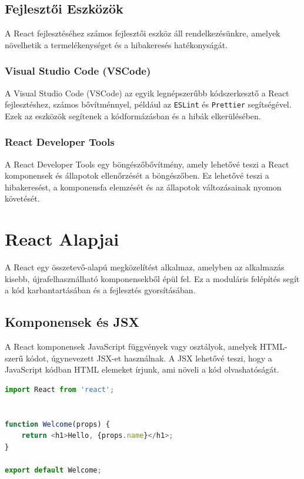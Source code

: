\documentclass[colorlinks]{thesis-kando}
\theoremstyle{definition}
\theoremstyle{remark}
\begin{document}
\subsection{Fejlesztői Eszközök}
A React fejlesztéséhez számos fejlesztői eszköz áll rendelkezésünkre, amelyek növelhetik a termelékenységet és a hibakeresés hatékonyságát.

\subsubsection{Visual Studio Code (VSCode)}
A Visual Studio Code (VSCode) az egyik legnépszerűbb kódszerkesztő a React fejlesztéshez, számos bővítménnyel, például az \texttt{ESLint} és \texttt{Prettier} segítségével. Ezek az eszközök segítenek a kódformázásban és a hibák elkerülésében.

\subsubsection{React Developer Tools}
A React Developer Tools egy böngészőbővítmény, amely lehetővé teszi a React komponensek és állapotok ellenőrzését a böngészőben. Ez lehetővé teszi a hibakeresést, a komponensfa elemzését és az állapotok változásainak nyomon követését.

\section{React Alapjai}
A React egy összetevő-alapú megközelítést alkalmaz, amelyben az alkalmazás kisebb, újrafelhasználható komponensekből épül fel. Ez a moduláris felépítés segít a kód karbantartásában és a fejlesztés gyorsításában.

\subsection{Komponensek és JSX}
A React komponensek JavaScript függvények vagy osztályok, amelyek HTML-szerű kódot, úgynevezett JSX-et használnak. A JSX lehetővé teszi, hogy a JavaScript kódban HTML elemeket írjunk, ami növeli a kód olvashatóságát.

\pagebreak

\begin{lstlisting}[language=JavaScript]
import React from 'react';


function Welcome(props) {
    return <h1>Hello, {props.name}</h1>;
}

export default Welcome;
\end{lstlisting}
\end{document}

